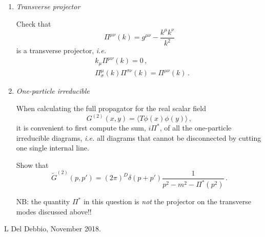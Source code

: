 \documentclass[12pt,a4paper]{article}
\newcommand{\munu}{{\mu\nu}}
\begin{document}
\begin{enumerate}
    \bigskip
    
    \item \emph{ Transverse projector}
      
      Check that 
      \[
      \Pi^\munu(k) = g^\munu - \frac{k^\mu k^\nu}{k^2}
      \]
      is a transverse projector, {\em i.e.}
      \begin{align*}
        & k_\mu \Pi^\munu(k) =  0 \, , \\
        & \Pi^\mu_\sigma(k) \Pi^{\sigma\nu}(k) = \Pi^\munu(k) \, .
      \end{align*}
      
      \bigskip

    \item \emph{ One-particle irreducible}

      When calculating the full propagator for the real scalar field
      \[
      G^{(2)}(x,y) = \langle T \phi(x) \phi(y) \rangle\, ,
      \]
      it is convenient to first compute the sum, $i\Pi^*$, of all the
      one-particle irreducible diagrams, {\em i.e.} all diagrams that
      cannot be disconnected by cutting one single internal line. 
 
      Show that 
      \[
      \tilde{G}^{(2)}(p,p') = (2\pi)^D \delta(p+p')
      \frac{1}{p^2-m^2-\Pi^*(p^2)}\, .
      \]
      
      NB: the quantity $\Pi^*$ in this question is {\em not} the
      projector on the transverse modes discussed above!!

\end{enumerate}

\vfill
\hspace*{\fill}\tiny L Del Debbio, November 2018.
\end{document}
